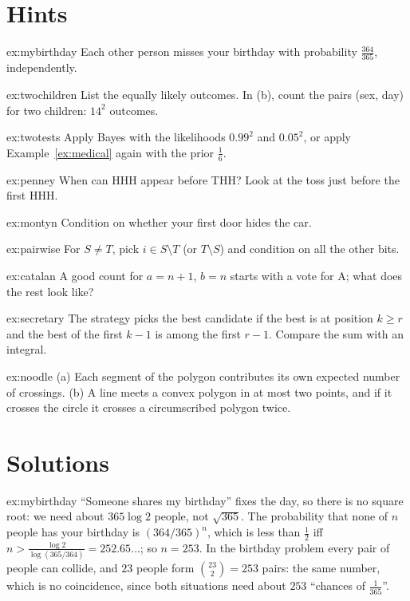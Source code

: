 \section{Hints}

\begin{hint}{ex:mybirthday}
Each other person misses your birthday with probability $\frac{364}{365}$, independently.
\end{hint}
\begin{hint}{ex:twochildren}
List the equally likely outcomes. In (b), count the pairs (sex, day) for two children: $14^2$ outcomes.
\end{hint}
\begin{hint}{ex:twotests}
Apply Bayes with the likelihoods $0.99^2$ and $0.05^2$, or apply Example~\ref{ex:medical} again with the prior $\frac16$.
\end{hint}
\begin{hint}{ex:penney}
When can HHH appear before THH? Look at the toss just before the first HHH.
\end{hint}
\begin{hint}{ex:montyn}
Condition on whether your first door hides the car.
\end{hint}
\begin{hint}{ex:pairwise}
For $S\ne T$, pick $i\in S\setminus T$ (or $T\setminus S$) and condition on all the other bits.
\end{hint}
\begin{hint}{ex:catalan}
A good count for $a=n+1$, $b=n$ starts with a vote for A; what does the rest look like?
\end{hint}
\begin{hint}{ex:secretary}
The strategy picks the best candidate if the best is at position $k\ge r$ and the best of the first $k-1$ is
among the first $r-1$. Compare the sum with an integral.
\end{hint}
\begin{hint}{ex:noodle}
(a) Each segment of the polygon contributes its own expected number of crossings. (b) A line meets a convex polygon
in at most two points, and if it crosses the circle it crosses a circumscribed polygon twice.
\end{hint}

\section{Solutions}

\begin{solution}{ex:mybirthday}
\idea ``Someone shares my birthday'' fixes the day, so there is no square root: we need about $365\log2$ people,
not $\sqrt{365}$.
\writeup The probability that none of $n$ people has your birthday is $(364/365)^n$, which is less than $\frac12$
iff $n>\frac{\log2}{\log(365/364)}=252.65\ldots$; so $n=253$. In the birthday problem every pair of people can
collide, and $23$ people form $\binom{23}2=253$ pairs: the same number, which is no coincidence, since both
situations need about $253$ ``chances of $\frac1{365}$''.
\end{solution}

